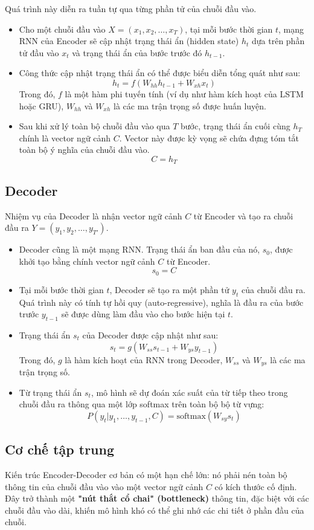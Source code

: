 Quá trình này diễn ra tuần tự qua từng phần tử của chuỗi đầu vào.
\begin{itemize}
    \item Cho một chuỗi đầu vào $X = (x_1, x_2, \dots, x_T)$, tại mỗi bước thời gian $t$, mạng RNN của Encoder sẽ cập nhật trạng thái ẩn (hidden state) $h_t$ dựa trên phần tử đầu vào $x_t$ và trạng thái ẩn của bước trước đó $h_{t-1}$.
    \item Công thức cập nhật trạng thái ẩn có thể được biểu diễn tổng quát như sau:
    $$ h_t = f(W_{hh}h_{t-1} + W_{xh}x_t) $$
    Trong đó, $f$ là một hàm phi tuyến tính (ví dụ như hàm kích hoạt của LSTM hoặc GRU), $W_{hh}$ và $W_{xh}$ là các ma trận trọng số được huấn luyện.
    \item Sau khi xử lý toàn bộ chuỗi đầu vào qua $T$ bước, trạng thái ẩn cuối cùng $h_T$ chính là vector ngữ cảnh $C$. Vector này được kỳ vọng sẽ chứa đựng tóm tắt toàn bộ ý nghĩa của chuỗi đầu vào.
    $$ C = h_T $$
\end{itemize}

\subsection{Decoder}
Nhiệm vụ của Decoder là nhận vector ngữ cảnh $C$ từ Encoder và tạo ra chuỗi đầu ra $Y = (y_1, y_2, \dots, y_{T'})$.

\begin{itemize}
    \item Decoder cũng là một mạng RNN. Trạng thái ẩn ban đầu của nó, $s_0$, được khởi tạo bằng chính vector ngữ cảnh $C$ từ Encoder.
    $$ s_0 = C $$
    \item Tại mỗi bước thời gian $t$, Decoder sẽ tạo ra một phần tử $y_t$ của chuỗi đầu ra. Quá trình này có tính tự hồi quy (auto-regressive), nghĩa là đầu ra của bước trước $y_{t-1}$ sẽ được dùng làm đầu vào cho bước hiện tại $t$.
    \item Trạng thái ẩn $s_t$ của Decoder được cập nhật như sau:
    $$ s_t = g(W_{ss}s_{t-1} + W_{ys}y_{t-1}) $$
    Trong đó, $g$ là hàm kích hoạt của RNN trong Decoder, $W_{ss}$ và $W_{ys}$ là các ma trận trọng số.
    \item Từ trạng thái ẩn $s_t$, mô hình sẽ dự đoán xác suất của từ tiếp theo trong chuỗi đầu ra thông qua một lớp softmax trên toàn bộ bộ từ vựng:
    $$ P(y_t | y_1, \dots, y_{t-1}, C) = \text{softmax}(W_{sy}s_t) $$
\end{itemize}

\subsection{Cơ chế tập trung}
Kiến trúc Encoder-Decoder cơ bản có một hạn chế lớn: nó phải nén toàn bộ thông tin của chuỗi đầu vào vào một vector ngữ cảnh $C$ có kích thước cố định. Đây trở thành một \textbf{"nút thắt cổ chai" (bottleneck)} thông tin, đặc biệt với các chuỗi đầu vào dài, khiến mô hình khó có thể ghi nhớ các chi tiết ở phần đầu của chuỗi.

